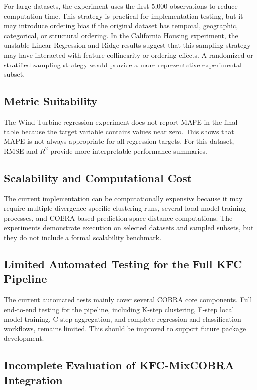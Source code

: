 \hs For large datasets, the experiment uses the first 5,000 observations to reduce computation time. This strategy is practical for implementation testing, but it may introduce ordering bias if the original dataset has temporal, geographic, categorical, or structural ordering. In the California Housing experiment, the unstable Linear Regression and Ridge results suggest that this sampling strategy may have interacted with feature collinearity or ordering effects. A randomized or stratified sampling strategy would provide a more representative experimental subset.

\subsection{Metric Suitability}

\hs The Wind Turbine regression experiment does not report MAPE in the final table because the target variable contains values near zero. This shows that MAPE is not always appropriate for all regression targets. For this dataset, RMSE and $R^2$ provide more interpretable performance summaries.

\subsection{Scalability and Computational Cost}

\hs The current implementation can be computationally expensive because it may require multiple divergence-specific clustering runs, several local model training processes, and COBRA-based prediction-space distance computations. The experiments demonstrate execution on selected datasets and sampled subsets, but they do not include a formal scalability benchmark.

\subsection{Limited Automated Testing for the Full KFC Pipeline}

\hs The current automated tests mainly cover several COBRA core components. Full end-to-end testing for the \KFCProcedure{} pipeline, including K-step clustering, F-step local model training, C-step aggregation, and complete regression and classification workflows, remains limited. This should be improved to support future package development.

\subsection{Incomplete Evaluation of KFC-MixCOBRA Integration}

